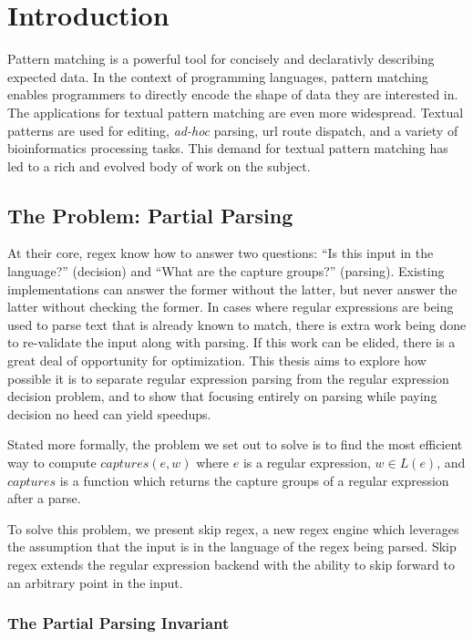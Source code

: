 \chapter{Introduction}
\label{chapter:introduction}

Pattern matching is a powerful tool for concisely and declarativly
describing expected data. In the context of programming languages,
pattern matching enables programmers to directly encode the shape
of data they are interested in. The applications for textual pattern
matching are even more widespread. Textual patterns are used for
editing, \textit{ad-hoc} parsing, url route dispatch, and a variety of
bioinformatics processing tasks. This demand for textual pattern
matching has led to a rich and evolved body of work on the subject.

\section{The Problem: Partial Parsing}

At their core, regex know how to answer two questions: ``Is this
input in the language?'' (decision) and ``What are the capture
groups?'' (parsing). Existing implementations can answer the former
without the latter, but never answer the latter without checking
the former. In cases where regular expressions are being used to
parse text that is already known to match, there is extra work being done
to re-validate the input along with parsing. If this work can be
elided, there is a great deal of opportunity for optimization.
This thesis aims to explore how possible it is to separate regular
expression parsing from the regular expression decision problem,
and to show that focusing entirely on parsing while paying decision
no heed can yield speedups.

Stated more formally, the problem we set out to solve is to find
the most efficient way to compute $captures(e, w)$ where $e$ is
a regular expression, $w \in L(e)$, and $captures$ is a function
which returns the capture groups of a regular expression after
a parse.

To solve this problem, we present skip regex, a new regex engine
which leverages the assumption that the input is in the language
of the regex being parsed. Skip regex extends the regular expression
backend with the ability to skip forward to an arbitrary point in the
input.

\subsection{The Partial Parsing Invariant}

